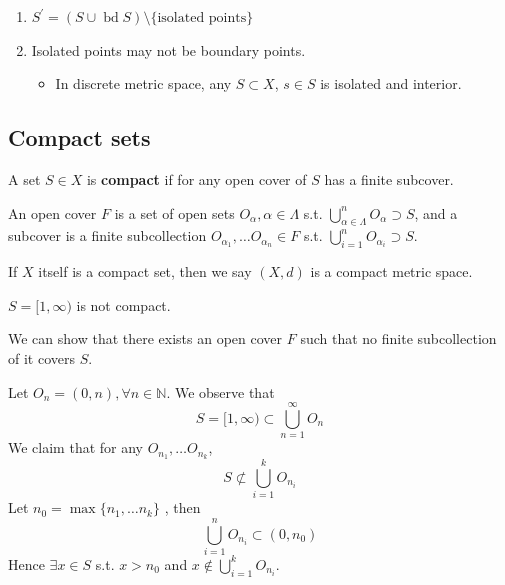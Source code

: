 \begin{remark}
    \begin{enumerate}
        \item $S^{\prime} = (S \cup \operatorname{bd} S) \setminus \{ \text{isolated points} \} $
        \item Isolated points may not be boundary points.
        \begin{itemize}
            \item In discrete metric space, any $S \subset X$, $s \in S$ is isolated and interior.
        \end{itemize} 
    \end{enumerate}
\end{remark}

\subsection{Compact sets}

\begin{definition}[Compactness]
    A set $S \in X$ is \textbf{compact}
    if for any open cover 
    of $S$  has a finite subcover.
    \medskip

    An open cover $F$ is a set of open sets $O_{\alpha}, \alpha \in \Lambda$
    s.t. $\bigcup_{\alpha \in \Lambda}^n O_{\alpha} \supset S$,
    and a subcover is a finite subcollection $O_{\alpha_1}, \hdots O_{\alpha_n} \in F$
    s.t. $\bigcup_{i = 1}^n O_{\alpha_i} \supset S$.
    \medskip

    If $X$ itself is a compact set, then we say $(X, d)$ is a compact metric space.
\end{definition}

\begin{example}
    $S = [1, \infty)$ is not compact. 

    We can show that there exists an open cover $F$ such that no finite subcollection 
    of it covers $S$. 

    Let $O_n = (0, n), \forall n \in \mathbb{N}$. 
    We observe that 
    \[
        S = [1, \infty) \subset \bigcup_{n = 1}^{\infty} O_n
    \]
    We claim that for any $O_{n_1}, \hdots O_{n_k}$, 
    \[
        S \not \subset \bigcup_{i = 1}^k O_{n_i}
    \]
    Let $n_0 = \max \{ n_1, \hdots n_k \} $ , then 
    \[
        \bigcup_{i = 1}^n O_{n_i} \subset (0, n_0)
    \]
    Hence $\exists x \in S$ s.t. $x > n_0$ and $x \notin \bigcup_{i = 1}^k O_{n_i}$.
\end{example}

